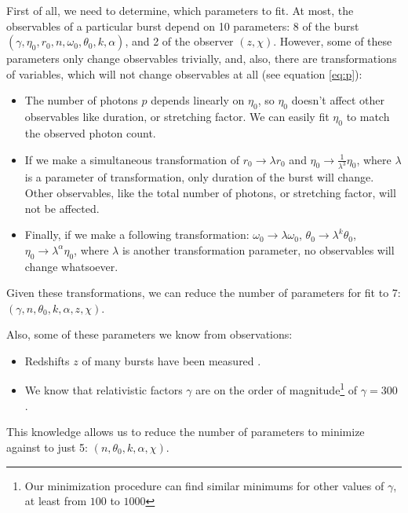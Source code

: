 \documentclass{article}
\begin{document}
First of all, we need to determine, which parameters to fit. At most, the observables of a particular burst depend on 10 parameters: 8 of the burst $\left(\gamma, \eta_0, r_0, n, \omega_0, \theta_0, k, \alpha\right)$, and 2 of the observer $\left(z, \chi\right)$. However, some of these parameters only change observables trivially, and, also, there are transformations of variables, which will not change observables at all (see equation \ref{eq:p}):
\begin{itemize}
	\item{The number of photons $p$ depends linearly on $\eta_0$, so $\eta_0$ doesn't affect other observables like duration, or stretching factor. We can easily fit $\eta_0$ to match the observed photon count.}
	\item{If we make a simultaneous transformation of $r_0 \rightarrow \lambda r_0$ and $\eta_0 \rightarrow \frac{1}{\lambda^3}\eta_0$, where $\lambda$ is a parameter of transformation, only duration of the burst will change. Other observables, like the total number of photons, or stretching factor, will not be affected.}
	\item{Finally, if we make a following transformation: $\omega_0 \rightarrow \lambda \omega_0$, $\theta_0 \rightarrow \lambda^k \theta_0$, $\eta_0 \rightarrow \lambda^\alpha \eta_0$, where $\lambda$ is another transformation parameter, no observables will change whatsoever.}
\end{itemize}
Given these transformations, we can reduce the number of parameters for fit to 7: $\left(\gamma, n, \theta_0, k, \alpha, z, \chi\right)$.

Also, some of these parameters we know from observations:
\begin{itemize}
	\item{Redshifts $z$ of many bursts have been measured \cite{Ackermann:2013zfa}.}
	\item{We know that relativistic factors $\gamma$ are on the order of magnitude\footnote{Our minimization procedure can find similar minimums for other values of $\gamma$, at least from $100$ to $1000$} of $\gamma = 300$ \cite{Ghirlanda:2011ux}.}
\end{itemize}
This knowledge allows us to reduce the number of parameters to minimize against to just 5: $\left(n, \theta_0, k, \alpha, \chi\right)$.
\end{document}
